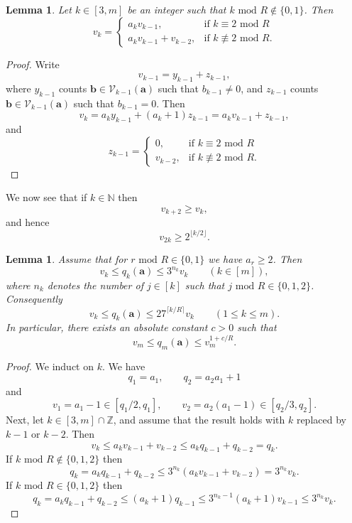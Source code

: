 \documentclass[12pt, reqno]{amsart}
\newtheorem{lemma}[thm]{Lemma}
\theoremstyle{definition}
\theoremstyle{remark}
\numberwithin{equation}{section}
\newcommand{\mmod}[1]{\,\,\mathrm{mod}\,\,#1}
\def\le{\leqslant} \def\ge{\geqslant}
\def \bN {\mathbb N}
\def \bZ {\mathbb Z}
\def \ba {\mathbf a}
\def \bb {\mathbf b}
\def \cV {\mathcal V}
\begin{document}
\begin{lemma} Let $k \in [3,m]$ be an integer such that $k \mmod R \notin \{0,1\}$. Then
\[
v_k =
\begin{cases}
a_k v_{k-1}, &\text{if }
k \equiv 2 \mmod R \\
a_k v_{k-1} + v_{k-2}, &\text{if } k \not \equiv 2 \mmod R.
\end{cases}
\]
\end{lemma}

\begin{proof} Write
\[
v_{k-1} = y_{k-1} + z_{k-1},
\]
where $y_{k-1}$ counts $\bb \in \cV_{k-1}(\ba)$ such that $b_{k-1} \ne 0$, and $z_{k-1}$ counts $\bb \in \cV_{k-1}(\ba)$ such that $b_{k-1} = 0$. Then
\[
v_k = a_k y_{k-1} + (a_k + 1) z_{k-1}
= a_k v_{k-1} + z_{k-1},
\]
and
\[
z_{k-1} = 
\begin{cases}
0, &\text{if }
k \equiv 2 \mmod R \\
v_{k-2}, &\text{if } k \not \equiv 2 \mmod R.
\end{cases}
\]
\end{proof}

We now see that if $k \in \bN$ then
\[
v_{k+2} \ge v_k,
\]
and hence
\[
v_{2k} \ge 2^{\lfloor k/2 \rfloor}.
\]

\begin{lemma} \label{vq} 
Assume that for $r \mmod R \in \{0,1\}$ we have $a_r \ge 2$. Then
\[
v_k \le q_k(\ba) \le 3^{n_k} v_k \qquad (k \in [m]),
\]
where $n_k$ denotes the number of $j \in [k]$ such that $j \mmod R \in \{0,1,2\}$.
Consequently
\[
v_k \le q_k(\ba) \le 
27^{\lceil k/R \rceil} v_k 
\qquad (1 \le k \le m).
\]
In particular, there exists an absolute constant $c > 0$ such that
\[
v_m \le q_m(\ba) \le v_m^{1+c/R}.
\]
\end{lemma}

\begin{proof} We induct on $k$. We have
\[
q_1 = a_1, \qquad q_2 = a_2 a_1 + 1
\]
and
\[
v_1 = a_1 - 1 \in [q_1/2,q_1],
\qquad
v_2 = a_2 (a_1 - 1) \in [q_2/3,q_2].
\]
Next, let $k \in [3,m] \cap \bZ$, and assume that the result holds with $k$ replaced by $k-1$ or $k-2$. Then
\[
v_k \le a_k v_{k-1} + v_{k-2} \le a_k q_{k-1} + q_{k-2} = q_k.
\]
If $k \mmod R \notin \{0,1,2\}$ then
\[
q_k = a_k q_{k-1} + q_{k-2}
\le 3^{n_k} (a_k v_{k-1} + v_{k-2}) = 3^{n_k} v_k.
\]
If $k \mmod R \in \{0,1,2\}$ then
\[
q_k =  a_k q_{k-1} + q_{k-2} \le (a_k + 1) q_{k-1} \le 3^{n_k - 1} (a_k + 1) v_{k-1} \le 3^{n_k} v_k.
\]
\end{proof}
\end{document}
